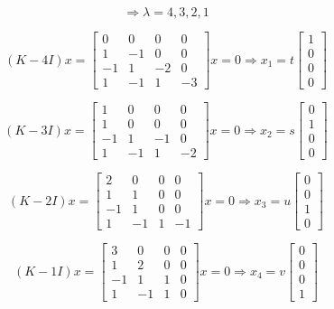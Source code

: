 \documentclass[12pt]{article}
\begin{document}
\[
\Rightarrow \lambda = 4, 3, 2, 1
\]

\[
(K - 4I)x = \begin{bmatrix} 0 & 0 & 0 & 0 \\ 1 & -1 & 0 & 0 \\ -1 & 1 & -2 & 0 \\ 1 & -1 & 1 & -3 \end{bmatrix}x = 0 \Rightarrow x_1 = t\begin{bmatrix} 1 \\ 0 \\ 0 \\ 0 \end{bmatrix}
\]

\[
(K - 3I)x = \begin{bmatrix} 1 & 0 & 0 & 0 \\ 1 & 0 & 0 & 0 \\ -1 & 1 & -1 & 0 \\ 1 & -1 & 1 & -2 \end{bmatrix}x = 0 \Rightarrow x_2 = s\begin{bmatrix} 0 \\ 1 \\ 0 \\ 0 \end{bmatrix}
\]

\[
(K - 2I)x = \begin{bmatrix} 2 & 0 & 0 & 0 \\ 1 & 1 & 0 & 0 \\ -1 & 1 & 0 & 0 \\ 1 & -1 & 1 & -1 \end{bmatrix}x = 0 \Rightarrow x_3 = u\begin{bmatrix} 0 \\ 0 \\ 1 \\ 0 \end{bmatrix}
\]

\[
(K - 1I)x = \begin{bmatrix} 3 & 0 & 0 & 0 \\ 1 & 2 & 0 & 0 \\ -1 & 1 & 1 & 0 \\ 1 & -1 & 1 & 0 \end{bmatrix}x = 0 \Rightarrow x_4 = v\begin{bmatrix} 0 \\ 0 \\ 0 \\ 1 \end{bmatrix}
\]
\end{document}
